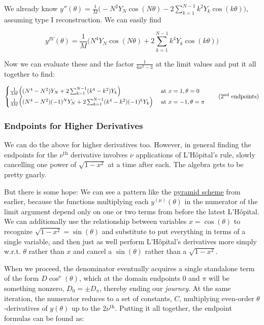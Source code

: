 \documentclass[10pt]{article}
\begin{document}
We already know $y''(\theta) = \frac{1}{M} \Big(-N^2 Y_N \cos(N\theta) - 2 \sum_{k=1}^{N-1} k^2 Y_k \cos(k\theta) \Big)$, assuming type I reconstruction. We can easily find

$$y^{IV}(\theta) = \frac{1}{M} \Big(N^4 Y_N \cos(N\theta) + 2 \sum_{k=1}^{N-1} k^4 Y_k \cos(k\theta) \Big)$$

Now we can evaluate these and the factor $\frac{1}{6x^2 - 3}$ at the limit values and put it all together to find: 

\[
\begin{cases} \frac{1}{3M} \Big((N^4 - N^2) Y_N + 2 \sum_{k=1}^{N-1} (k^4 - k^2) Y_k \Big) & \text{ at } x=1, \theta=0 \\ \frac{1}{3M} \Big((N^4 - N^2)(-1)^N Y_N + 2 \sum_{k=1}^{N-1} (k^4 - k^2) (-1)^k Y_k \Big) & \text{ at } x=-1, \theta=\pi \end{cases} \tag{$2^\text{nd}$ endpoints}
\]

\subsubsection{Endpoints for Higher Derivatives}

We can do the above for higher derivatives too. However, in general finding the endpoints for the $\nu^\text{th}$ derivative involves $\nu$ applications of L'Hôpital's rule, slowly cancelling one power of $\sqrt{1-x^2}$ at a time after each. The algebra gets to be pretty gnarly.

But there is some hope: We can see a pattern like the \hyperref[pyramid]{pyramid scheme} from earlier, because the functions multiplying each $y^{(\mu)}(\theta)$ in the numerator of the limit argument depend only on one or two terms from before the latest L'Hôpital. We can additionally use the relationship between variables $x = \cos(\theta)$ to recognize $\sqrt{1-x^2} = \sin(\theta)$ and substitute to put everything in terms of a single variable, and then just as well perform L'Hôpital's derivatives more simply w.r.t. $\theta$ rather than $x$ and cancel a $\sin(\theta)$ rather than a $\sqrt{1-x^2}$.

When we proceed, the denominator eventually acquires a single standalone term of the form $D\cos^\nu(\theta)$, which at the domain endpoints $0$ and $\pi$ will be something nonzero, $D_0 = \pm D_\pi$, thereby ending our \textit{journey}. At the same iteration, the numerator reduces to a set of constants, $C$, multiplying even-order $\theta$-derivatives of $y(\theta)$ up to the $2\nu^\text{th}$. Putting it all together, the endpoint formulas can be found as:
\end{document}
